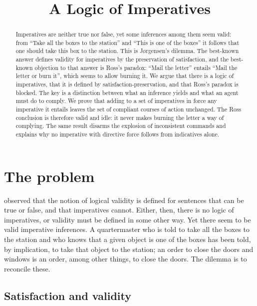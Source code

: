 \documentclass{situationist-preprint}
\title{A Logic of Imperatives}
\begin{document}
\maketitle

\begin{abstract}
Imperatives are neither true nor false, yet some inferences among them seem valid: from \enquote{Take all the boxes to the station} and \enquote{This is one of the boxes} it follows that one should take this box to the station. This is Jørgensen's dilemma. The best-known answer defines validity for imperatives by the preservation of satisfaction, and the best-known objection to that answer is Ross's paradox: \enquote{Mail the letter} entails \enquote{Mail the letter or burn it}, which seems to allow burning it. We argue that there is a logic of imperatives, that it is defined by satisfaction-preservation, and that Ross's paradox is blocked. The key is a distinction between what an inference yields and what an agent must do to comply. We prove that adding to a set of imperatives in force any imperative it entails leaves the set of compliant courses of action unchanged. The Ross conclusion is therefore valid and idle: it never makes burning the letter a way of complying. The same result disarms the explosion of inconsistent commands and explains why no imperative with directive force follows from indicatives alone.
\end{abstract}

\section{The problem}

\citet{Jorgensen1938} observed that the notion of logical validity is defined for sentences that can be true or false, and that imperatives cannot. Either, then, there is no logic of imperatives, or validity must be defined in some other way. Yet there seem to be valid imperative inferences. A quartermaster who is told to take all the boxes to the station and who knows that a given object is one of the boxes has been told, by implication, to take that object to the station; an order to close the doors and windows is an order, among other things, to close the doors. The dilemma is to reconcile these.

\subsection{Satisfaction and validity}
\end{document}
